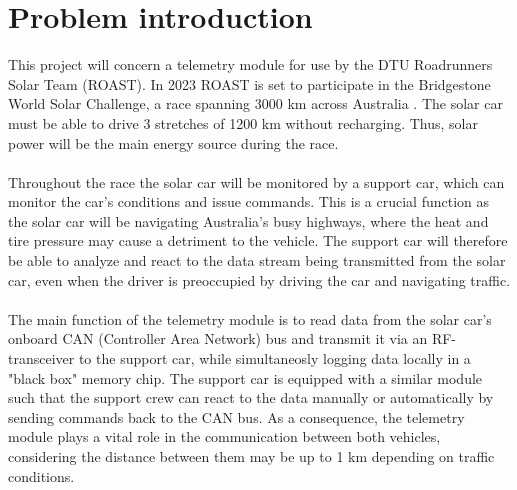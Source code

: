 \documentclass[]{article}
\begin{document}
\section{Problem introduction}

This project will concern a telemetry module for use by the DTU Roadrunners Solar Team (ROAST). In 2023 ROAST is set to participate in the Bridgestone World Solar Challenge, a race spanning 3000 km across Australia \cite{wsc}. The solar car must be able to drive 3 stretches of 1200 km without recharging. Thus, solar power will be the main energy source during the race. \\
\\
Throughout the race the solar car will be monitored by a support car, which can monitor the car's conditions and issue commands. This is a crucial function as the solar car will be navigating Australia's busy highways, where the heat and tire pressure may cause a detriment to the vehicle. The support car will therefore be able to analyze and react to the data stream being transmitted from the solar car, even when the driver is preoccupied by driving the car and navigating traffic. \\
\\
The main function of the telemetry module is to read data from the solar car's onboard CAN (Controller Area Network) bus and transmit it via an RF-transceiver to the support car, while simultaneosly logging data locally in a "black box" memory chip. The support car is equipped with a similar module such that the support crew can react to the data manually or automatically by sending commands back to the CAN bus. As a consequence, the telemetry module plays a vital role in the communication between both vehicles, considering the distance between them may be up to 1 km depending on traffic conditions. 
\end{document}
